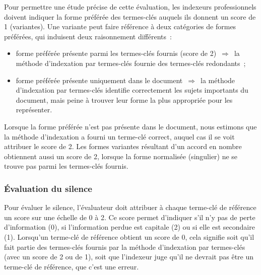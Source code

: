         Pour permettre une étude précise de cette évaluation, les indexeurs
        professionnels doivent indiquer la forme préférée des termes-clés
        auquels ils donnent un score de 1 (variantes). Une variante peut faire
        référence à deux catégories de formes préférées, qui induisent deux
        raisonnement différents~:
        \begin{itemize}
          \item{forme préférée présente parmi les termes-clés fournis (score de
                2)~$\Rightarrow$~la méthode d'indexation par termes-clés fournie
                des termes-clés redondants~;}
          \item{forme préférée présente uniquement dans le
                document~$\Rightarrow$~la méthode d'indexation par termes-clés
                identifie correctement les sujets importants du document, mais
                peine à trouver leur forme la plus appropriée pour les
                représenter.}
        \end{itemize}

        Lorsque la forme préférée n'est pas présente dans le document, nous
        estimons que la méthode d'indexation a fourni un terme-clé correct,
        auquel cas il se voit attribuer le score de 2. Les formes variantes
        résultant d'un accord en nombre obtiennent aussi un score de 2, lorsque
        la forme normalisée (singulier) ne se trouve pas parmi les termes-clés
        fournis.



      \subsubsection{Évaluation du silence}
      \label{subsubsec:main-automatic_evaluation_of_keyphrase_annotation-methodology-evaluation_protocol-silence}
        Pour évaluer le silence, l'évaluateur doit attribuer à chaque terme-clé
        de référence un score sur une échelle de 0 à 2. Ce score permet
        d'indiquer s'il n'y pas de perte d'information (0), si l'information
        perdue est capitale (2) ou si elle est secondaire (1).  Lorsqu'un
        terme-clé de référence obtient un score de 0, cela signifie soit qu'il
        fait partie des termes-clés fournis par la méthode d'indexation par
        termes-clés (avec un score de 2 ou de 1), soit que l'indexeur juge qu'il
        ne devrait pas être un terme-clé de référence, que c'est une erreur.

